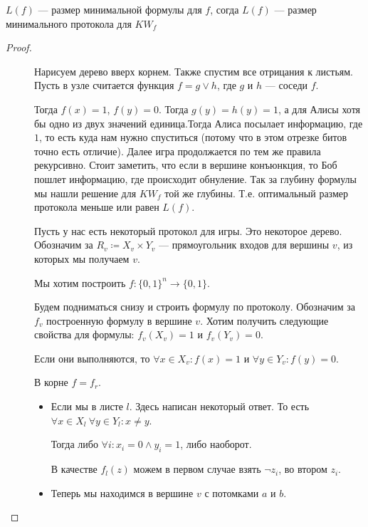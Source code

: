 \begin{thm}
	$ L(f) $ --- размер минимальной формулы для  $ f$, согда $ L(f)$ --- размер минимального протокола для  $ KW_f$
\end{thm}
\begin{proof}
    $ $
    \begin{description}
		\item [] Нарисуем дерево вверх корнем. Также спустим все отрицания к листьям. Пусть в узле считается функция $ f = g \vee h$, где  $ g$ и  $h$ --- соседи  $ f$.

			Тогда $ f(x) = 1$,  $ f(y) = 0$. Тогда $g(y) = h(y) = 1$, а для Алисы хотя бы одно из двух значений единица.Тогда Алиса посылает информацию, где $ 1$, то есть куда нам нужно спуститься (потому что в этом отрезке битов точно есть отличие). Далее игра продолжается по тем же правила рекурсивно. Стоит заметить, что если в вершине конъюнкция, то Боб пошлет информацию, где происходит обнуление. Так за глубину формулы мы нашли решение для $KW_f$ той же глубины. Т.е. оптимальный размер протокола меньше или равен $L(f)$.
		\item [] 
			Пусть у нас есть некоторый протокол для игры. Это некоторое дерево. Обозначим за $ R_v \coloneqq X_v \times Y_v$ --- прямоугольник входов для вершины $ v$, из которых мы получаем $ v$.

			Мы хотим построить $ f\colon \{0, 1\}^{n} \to \{0, 1\}$.

			Будем подниматься снизу и строить формулу по протоколу. Обозначим за $ f_v$ построенную формулу в вершине  $ v$. Хотим получить следующие свойства для формулы: $ f_v(X_v) = 1$ и  $ f_v(Y_v) = 0$.

			Если они выполняются, то $ \forall x \in X_v \colon f(x) = 1$ и $ \forall y \in Y_v \colon f(y) = 0$.

			В корне $ f = f_r$.

			\begin{itemize}
				\item Если мы в листе $ l$. Здесь написан некоторый ответ. То есть $ \forall x \in X_l ~\forall y \in Y_l \colon x \ne  y$.

					Тогда либо $ \forall i \colon x_i = 0 \wedge  y_i  = 1$, либо наоборот. %

					В качестве $ f_{l}(z) $ можем в первом случае взять $ \neg z_i$, во втором $z_i$.
				\item Теперь мы находимся в вершине $ v$ с потомками  $ a $ и $ b$.


\end{itemize}
\end{description}
\end{proof}
